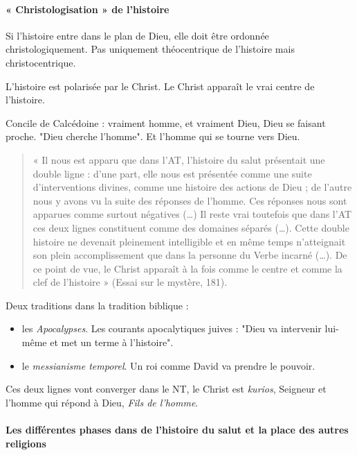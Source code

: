    
      \paragraph{« Christologisation » de l'histoire}
      Si l’histoire entre dans le plan de Dieu, elle doit être ordonnée christologiquement. Pas uniquement théocentrique de l’histoire mais christocentrique. 
      
      \begin{Synthesis}
      L'histoire est polarisée par le Christ. Le Christ apparaît le vrai centre de l'histoire.
      \end{Synthesis}
     Concile de Calcédoine : vraiment homme, et vraiment Dieu, Dieu se faisant proche. "Dieu cherche l'homme". Et l'homme qui se tourne vers Dieu.
     
      
      
      

\begin{quote}
    «  Il  nous  est  apparu  que  dans  l’AT,  l’histoire  du  salut  présentait  une  double  ligne  :  d’une  part,  elle nous  est  présentée  comme  une  suite  d’interventions  divines,  comme  une  histoire  des  actions  de  Dieu  ; de  l’autre  nous  y  avons  vu  la  suite  des  réponses  de  l’homme.  Ces  réponses  nous  sont  apparues  comme surtout  négatives  (…)  Il  reste  vrai  toutefois  que  dans  l’AT  ces  deux  lignes  constituent  comme  des domaines  séparés  (…).  Cette  double  histoire  ne  devenait  pleinement  intelligible  et  en  même  temps n’atteignait  son  plein  accomplissement  que  dans  la  personne  du  Verbe  incarné  (…).  De  ce  point  de vue,  le  Christ  apparaît  à  la  fois  comme  le  centre  et  comme  la  clef  de  l’histoire  »  (Essai  sur  le  mystère, 181). 
\end{quote}

Deux traditions dans la tradition biblique :
\begin{itemize}
    \item les \textit{Apocalypses}. Les courants apocalytiques juives : "Dieu va intervenir lui-même et met un terme à l'histoire". 
    \item le \textit{messianisme temporel}.  Un roi comme David va prendre le pouvoir.
\end{itemize}

Ces deux lignes vont converger dans le NT, le Christ est \textit{kurios}, Seigneur et l'homme qui répond à Dieu, \textit{Fils de l'homme}. 

      \paragraph{Les différentes phases dans de l'histoire du salut et la place des
      autres religions}
      
